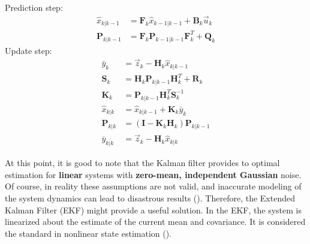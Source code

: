 \begin{centering}
Prediction step:
\begin{align}
    \hat{x}_{k|k-1} &= \mathbf{F}_k\hat{x}_{k-1|k-1} + \mathbf{B}_k\vec{u}_k\\
    \mathbf{P}_{k|k-1} &= \mathbf{F}_k\mathbf{P}_{k-1|k-1}\mathbf{F}_k^T+\mathbf{Q}_k
\end{align}
Update step:
\begin{align}
    \bar{y}_k &= \vec{z}_k - \mathbf{H}_k\hat{x}_{k|k-1} \\
    \mathbf{S}_k &= \mathbf{H}_k\mathbf{P}_{k|k-1}\mathbf{H}_k^T + \mathbf{R}_k \\
    \mathbf{K}_k &= \mathbf{P}_{k|k-1}\mathbf{H}_k^T\mathbf{S}_k^{-1} \\
    \hat{x}_{k|k} &= \hat{x}_{k|k-1} + \mathbf{K}_k\bar{y}_k \\
    \mathbf{P}_{k|k} &= \left(\mathbf{I} - \mathbf{K}_k\mathbf{H}_k\right)\mathbf{P}_{k|k-1} \\
    \bar{y}_{k|k}&= \vec{z}_k - \mathbf{H}_k\hat{x}_{k|k}
\end{align}
\end{centering}

At this point, it is good to note that the Kalman filter provides to optimal estimation for \textbf{linear} systems with \textbf{zero-mean, independent Gaussian} noise. Of course, in reality these assumptions are not valid, and inaccurate modeling of the system dynamics can lead to disastrous results (\cite{EKF}). Therefore, the Extended Kalman Filter (EKF) might provide a useful solution. In the EKF, the system is linearized about the estimate of the current mean and covariance. It is considered the standard in nonlinear state estimation (\cite{kalmangood}).\\

